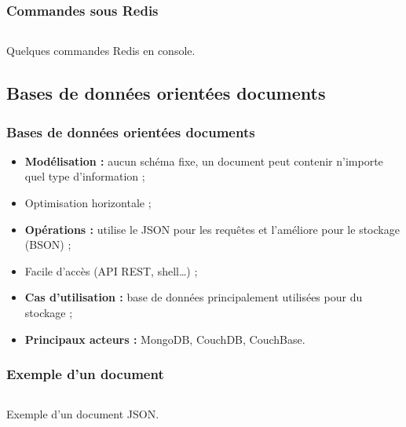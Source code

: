    \begin{frame}
        \frametitle{Commandes sous Redis}

        \begin{listing}[H]
            \inputminted[fontsize=\tiny, linenos=true]{text}{code/commandesRedis.txt}
            \caption{Quelques commandes Redis en console.}
        \end{listing}
    \end{frame}

    \subsection{Bases de données orientées documents}
    \begin{frame}
        \frametitle{Bases de données orientées documents}

        \begin{itemize}
            \item \textbf{Modélisation :} aucun schéma fixe, un document peut contenir n'importe quel type d'information ;
            \item Optimisation horizontale ;
            \item \textbf{Opérations :} utilise le JSON pour les requêtes et l'améliore pour le stockage (BSON) ;
            \item Facile d'accès (API REST, shell\dots) ;
            \item \textbf{Cas d'utilisation :} base de données principalement utilisées pour du stockage ;
            \item \textbf{Principaux acteurs :} MongoDB, CouchDB, CouchBase.
        \end{itemize}
    \end{frame}

    \begin{frame}
        \frametitle{Exemple d'un document}

        \begin{listing}[H]
            \inputminted[fontsize=\tiny, linenos=true]{json}{code/exemple-document.json}
            \caption{Exemple d'un document JSON.}
        \end{listing}
    \end{frame}



